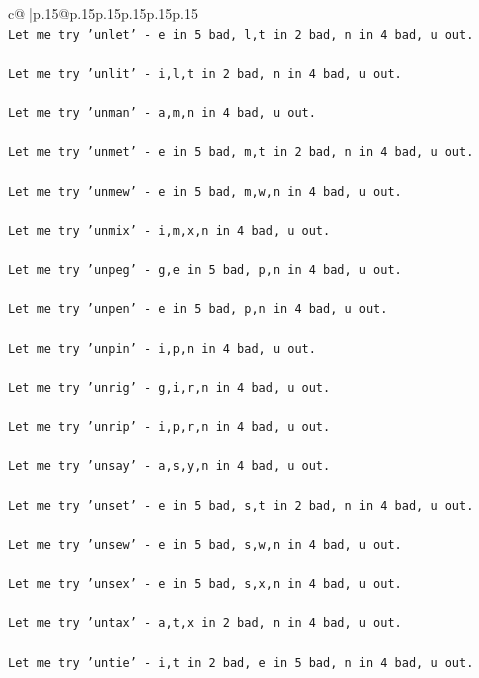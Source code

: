 \documentclass{article}
\begin{document}
{\begin{supertabular}{c@{$\;$}|p{.15\linewidth}@{}p{.15\linewidth}p{.15\linewidth}p{.15\linewidth}p{.15\linewidth}p{.15\linewidth}}
{{{\\ 
\texttt{Let me try 'unlet' {-} e in 5 bad, l,t in 2 bad, n in 4 bad, u out. } \\
\\ 
\texttt{Let me try 'unlit' {-} i,l,t in 2 bad, n in 4 bad, u out. } \\
\\ 
\texttt{Let me try 'unman' {-} a,m,n in 4 bad, u out. } \\
\\ 
\texttt{Let me try 'unmet' {-} e in 5 bad, m,t in 2 bad, n in 4 bad, u out. } \\
\\ 
\texttt{Let me try 'unmew' {-} e in 5 bad, m,w,n in 4 bad, u out. } \\
\\ 
\texttt{Let me try 'unmix' {-} i,m,x,n in 4 bad, u out. } \\
\\ 
\texttt{Let me try 'unpeg' {-} g,e in 5 bad, p,n in 4 bad, u out. } \\
\\ 
\texttt{Let me try 'unpen' {-} e in 5 bad, p,n in 4 bad, u out. } \\
\\ 
\texttt{Let me try 'unpin' {-} i,p,n in 4 bad, u out. } \\
\\ 
\texttt{Let me try 'unrig' {-} g,i,r,n in 4 bad, u out. } \\
\\ 
\texttt{Let me try 'unrip' {-} i,p,r,n in 4 bad, u out. } \\
\\ 
\texttt{Let me try 'unsay' {-} a,s,y,n in 4 bad, u out. } \\
\\ 
\texttt{Let me try 'unset' {-} e in 5 bad, s,t in 2 bad, n in 4 bad, u out. } \\
\\ 
\texttt{Let me try 'unsew' {-} e in 5 bad, s,w,n in 4 bad, u out. } \\
\\ 
\texttt{Let me try 'unsex' {-} e in 5 bad, s,x,n in 4 bad, u out. } \\
\\ 
\texttt{Let me try 'untax' {-} a,t,x in 2 bad, n in 4 bad, u out. } \\
\\ 
\texttt{Let me try 'untie' {-} i,t in 2 bad, e in 5 bad, n in 4 bad, u out. } \\
}}}
\end{supertabular}}
\end{document}
